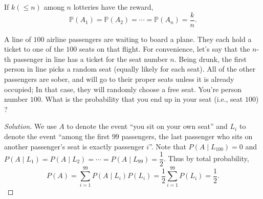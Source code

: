 \documentclass[11pt,singlecolumn, openany, citestyle=authoryear]{elegantbook}
\begin{document}
\begin{CJK}{UTF8}{gbsn}
    If $k(\leqslant n)$ among $n$ lotteries have the reward, 
    $$
    \mathbb{P}(A_1)=\mathbb{P}(A_2)=\cdots =\mathbb{P}(A_n)=\frac{k}{n}.
    $$
\begin{example}
    A line of $100$ airline passengers are waiting to board a plane. They each hold a ticket to one of the $100$ seats on that flight. 
    For convenience, let's say that the $n$-th passenger in line has a ticket for the seat number $n$. 
    Being drunk, the first person in line picks a random seat (equally likely for each seat). 
    All of the other passengers are sober, and will go to their proper seats unless it is already occupied; 
    In that case, they will randomly choose a free seat. 
    You're person number $100$. What is the probability that you end up in your seat (i.e., seat $100$) ?
\end{example}
\begin{proof}[Solution]
    We use $A$ to denote the event ``you sit on your own seat'' and 
    $L_i$ to denote the event ``among the first $99$ passengers,
    the last passenger who sits on another passenger's seat 
    is exactly passenger $i$''. Note that $P(A\mid L_{100})=0$ and $P(A\mid L_1)=
    P(A\mid L_2)=\cdots = P(A\mid L_{99})=\dfrac{1}{2}$. Thus by total probability,
    $$
    P(A)=\sum_{i=1}^{99} P(A\mid L_i)P(L_i)=\frac{1}{2}\sum_{i=1}^{99} P(L_i)
    =\frac{1}{2}.
    $$ 
\end{proof}


\end{CJK}
\end{document}
